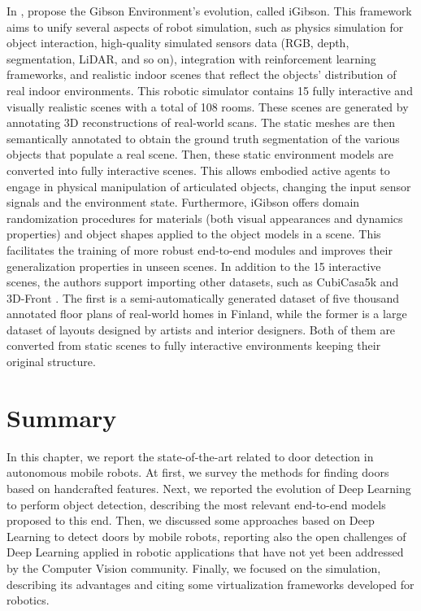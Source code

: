  In \cite{igibson}, \citeauthor{igibson} propose the Gibson Environment's evolution, called iGibson. This framework aims to unify several aspects of robot simulation, such as physics simulation for object interaction, high-quality simulated sensors data (RGB, depth, segmentation, LiDAR, and so on), integration with reinforcement learning frameworks, and realistic indoor scenes that reflect the objects' distribution of real indoor environments. This robotic simulator contains 15 fully interactive and visually realistic scenes with a total of 108 rooms. These scenes are generated  by annotating 3D reconstructions of real-world scans. The static meshes are then semantically annotated to obtain the ground truth segmentation of the various objects that populate a real scene. Then, these static environment models are converted into fully interactive scenes. This allows embodied active agents to engage in physical manipulation of articulated objects, changing the input sensor signals and the environment state. Furthermore, iGibson offers domain randomization procedures for materials (both visual appearances and dynamics properties) and object shapes applied to the object models in a scene. This facilitates the training of more robust end-to-end modules and improves their generalization properties in unseen scenes. In addition to the 15 interactive scenes, the authors support importing other datasets, such as CubiCasa5k \cite{cubicasa} and 3D-Front \cite{3dfront}. The first is a semi-automatically generated dataset of five thousand annotated floor plans of real-world homes in Finland, while the former is a large dataset of layouts designed by artists and interior designers. Both of them are converted from static scenes to fully interactive environments keeping their original structure. 
 
 \section{Summary}
 
 In this chapter, we report the state-of-the-art related to door detection in autonomous mobile robots. At first, we survey the methods for finding doors based on handcrafted features. Next, we reported the evolution of Deep Learning to perform object detection, describing the most relevant end-to-end models proposed to this end. Then, we discussed some approaches based on Deep Learning to detect doors by mobile robots, reporting also the open challenges of Deep Learning applied in robotic applications that have not yet been addressed by the Computer Vision community. Finally, we focused on the simulation, describing its advantages and citing some virtualization frameworks developed for robotics.
 

 
